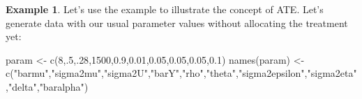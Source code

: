\documentclass[
]{book}
\newenvironment{Shaded}{\begin{snugshade}}{\end{snugshade}}
\newcommand{\DecValTok}[1]{\textcolor[rgb]{0.00,0.00,0.81}{#1}}
\newcommand{\FloatTok}[1]{\textcolor[rgb]{0.00,0.00,0.81}{#1}}
\newcommand{\FunctionTok}[1]{\textcolor[rgb]{0.00,0.00,0.00}{#1}}
\newcommand{\NormalTok}[1]{#1}
\newcommand{\OtherTok}[1]{\textcolor[rgb]{0.56,0.35,0.01}{#1}}
\newcommand{\StringTok}[1]{\textcolor[rgb]{0.31,0.60,0.02}{#1}}
\theoremstyle{definition}
\theoremstyle{definition}
\newtheorem{example}{Example}[chapter]
\theoremstyle{definition}
\theoremstyle{definition}
\theoremstyle{remark}
\begin{document}
\begin{example}
\protect\hypertarget{exm:unnamed-chunk-67}{}{\label{exm:unnamed-chunk-67} }Let's use the example to illustrate the concept of ATE.
Let's generate data with our usual parameter values without allocating the treatment yet:
\end{example}

\begin{Shaded}
\begin{Highlighting}[]
\NormalTok{param }\OtherTok{\textless{}{-}} \FunctionTok{c}\NormalTok{(}\DecValTok{8}\NormalTok{,.}\DecValTok{5}\NormalTok{,.}\DecValTok{28}\NormalTok{,}\DecValTok{1500}\NormalTok{,}\FloatTok{0.9}\NormalTok{,}\FloatTok{0.01}\NormalTok{,}\FloatTok{0.05}\NormalTok{,}\FloatTok{0.05}\NormalTok{,}\FloatTok{0.05}\NormalTok{,}\FloatTok{0.1}\NormalTok{)}
\FunctionTok{names}\NormalTok{(param) }\OtherTok{\textless{}{-}} \FunctionTok{c}\NormalTok{(}\StringTok{"barmu"}\NormalTok{,}\StringTok{"sigma2mu"}\NormalTok{,}\StringTok{"sigma2U"}\NormalTok{,}\StringTok{"barY"}\NormalTok{,}\StringTok{"rho"}\NormalTok{,}\StringTok{"theta"}\NormalTok{,}\StringTok{"sigma2epsilon"}\NormalTok{,}\StringTok{"sigma2eta"}\NormalTok{,}\StringTok{"delta"}\NormalTok{,}\StringTok{"baralpha"}\NormalTok{)}
\end{Highlighting}
\end{Shaded}
\end{document}
